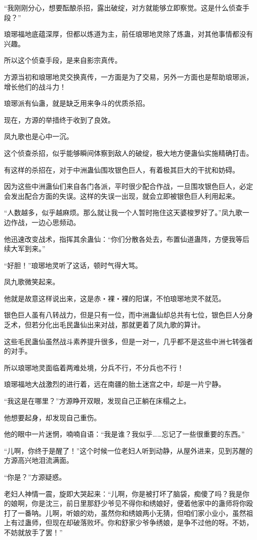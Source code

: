 \begin{this_body}
“我刚刚分心，想要酝酿杀招，露出破绽，对方就能够立即察觉。这是什么侦查手段？”

琅琊福地底蕴深厚，但都以炼道为主，前任琅琊地灵除了炼蛊，对其他事情都没有兴趣。

所以这个侦查手段，是来自影宗真传。

方源当初和琅琊地灵交换真传，一方面是为了交易，另外一方面也是帮助琅琊派，增长他们的战斗力！

琅琊派有仙蛊，就是缺乏用来争斗的优质杀招。

现在，方源的举措终于收到了良效。

凤九歌也是心中一沉。

这个侦查杀招，似乎能够瞬间体察到敌人的破绽，极大地方便蛊仙实施精确打击。

有这样的杀招在，对于中洲蛊仙围攻银色巨人，有着极其巨大的干扰和妨碍。

因为这些中洲蛊仙们来自各门各派，平时很少配合作战，一旦围攻银色巨人，必定会发出配合方面的失误。这样的失误一出现，就会立即被银色巨人利用起来。

“人数越多，似乎越麻烦。那么就让我一个人暂时拖住这天婆梭罗好了。”凤九歌一边作战，一边心思频动。

他迅速改变战术，指挥其余蛊仙：“你们分散各处去，布置仙道蛊阵，方便我等后续大军到来。”

“好胆！”琅琊地灵听了这话，顿时气得大骂。

凤九歌微笑起来。

他就是故意这样说出来，这是赤・裸・裸的阳谋，不怕琅琊地灵不就范。

银色巨人虽有八转战力，但是只有一位，而中洲蛊仙却总共有七位，银色巨人分身乏术，但若分化出毛民蛊仙出来对战，那就更着了凤九歌的算计。

这些毛民蛊仙虽然战斗素养提升很多，但是一对一，几乎都不是这些中洲七转强者的对手。

所以琅琊地灵面临着两难处境，分兵不行，不分兵也不行！

琅琊福地大战激烈的进行着，远在南疆的胎土迷宫之中，却是一片宁静。

“我这是在哪里？”方源睁开双眼，发现自己正躺在床榻之上。

他想要起身，却发现自己重伤。

他的眼中一片迷惘，喃喃自语：“我是谁？我似乎……忘记了一些很重要的东西。”

“儿啊，你终于是醒了！”这个时候一位老妇人听到动静，从屋外进来，见到苏醒的方源高兴地泪流满面。

“你是？”方源疑惑。

老妇人神情一震，旋即大哭起来：“儿啊，你是被打坏了脑袋，痴傻了吗？我是你的娘啊，你是沈三，前日里那舒少爷见不得你和绣娘好，便着他家中的蛊师将你殴打了一番呐。儿啊，听娘的劝，虽然你和绣娘两小无猜，但咱们家小业小，虽然祖上有过蛊师，但现在却破落败坏。你和舒家少爷争绣娘，是争不过他的呀。不妨，不妨就放手了罢！”


\end{this_body}

